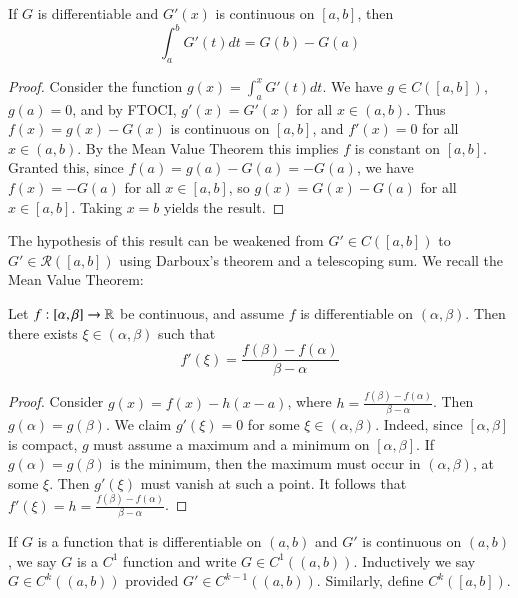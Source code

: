 \begin{thm}
    If $G$ is differentiable and $G'(x)$ is continuous on $[a,b]$, then $$\int_a^bG'(t)dt = G(b) - G(a)$$
\end{thm}
\begin{proof}
    Consider the function $g(x) = \int_a^xG'(t)dt$. We have $g \in C([a,b])$, $g(a) = 0$, and by FTOCI, $g'(x) = G'(x)$ for all $x \in (a,b)$. Thus $f(x) = g(x)-G(x)$ is continuous on $[a,b]$, and $f'(x) = 0$ for all $x \in (a,b)$. By the Mean Value Theorem this implies $f$ is constant on $[a,b]$. Granted this, since $f(a) = g(a)-G(a)= -G(a)$, we have $f(x) = -G(a)$ for all $x \in [a,b]$, so $g(x) = G(x) - G(a)$ for all $x \in [a,b]$. Taking $x = b$ yields the result.
\end{proof}

The hypothesis of this result can be weakened from $G' \in C([a,b])$ to $G' \in \mathcal{R}([a,b])$ using Darboux's theorem and a telescoping sum. We recall the Mean Value Theorem:

\begin{namthm}
    Let $f:[\alpha,\beta]\rightarrow \mathbb R$ be continuous, and assume $f$ is differentiable on $(\alpha,\beta)$. Then there exists $\xi \in (\alpha, \beta)$ such that $$f'(\xi) = \frac{f(\beta) - f(\alpha)}{\beta - \alpha}$$
\end{namthm}
\begin{proof}
    Consider $g(x) = f(x) - h(x-a)$, where $h = \frac{f(\beta) - f(\alpha)}{\beta - \alpha}$. Then $g(\alpha) = g(\beta)$. We claim $g'(\xi) = 0$ for some $\xi \in (\alpha,\beta)$. Indeed, since $[\alpha,\beta]$ is compact, $g$ must assume a maximum and a minimum on $[\alpha,\beta]$. If $g(\alpha) = g(\beta)$ is the minimum, then the maximum must occur in $(\alpha,\beta)$, at some $\xi$. Then $g'(\xi)$ must vanish at such a point. It follows that $f'(\xi) = h = \frac{f(\beta) - f(\alpha)}{\beta-\alpha}$.
\end{proof}


\begin{nota}
    If $G$ is a function that is differentiable on $(a,b)$ and $G'$ is continuous on $(a,b)$, we say $G$ is a $C^1$ function and write $G \in C^1((a,b))$. Inductively we say $G \in C^k((a,b))$ provided $G' \in C^{k-1}((a,b))$. Similarly, define $C^k([a,b])$.
\end{nota}


